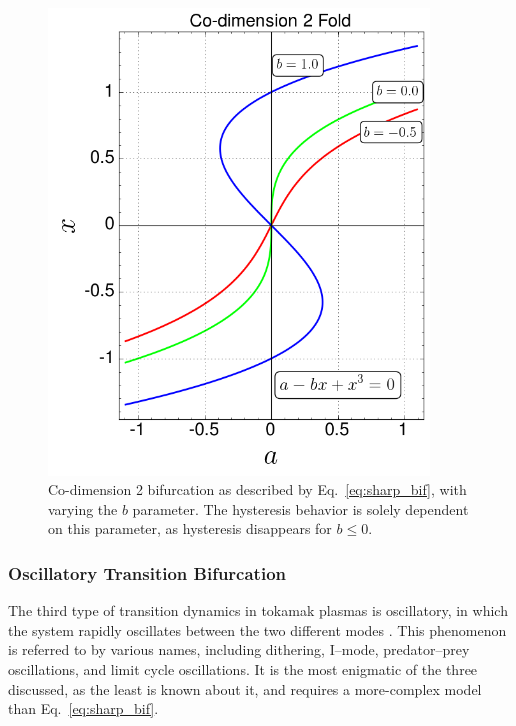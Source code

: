 \begin{figure}[tb] %
\begin{minipage}{0.49\linewidth}
	\centering
	\includegraphics[width=0.9\textwidth]{../Graphics/Bif_Graphs/co-2_fold_b_var.png}
\end{minipage}
\hfill
\begin{minipage}{0.49\linewidth}
	\caption{Co-dimension 2 bifurcation as described by Eq.~\ref{eq:sharp_bif}, with varying the $b$ parameter. The hysteresis behavior is solely dependent on this parameter, as hysteresis disappears for $b \leq 0$.}
	\label{fig:hysteresis_b_var}
\end{minipage}
\end{figure}

\subsubsection{Oscillatory Transition Bifurcation}
The third type of transition dynamics in tokamak plasmas is oscillatory, in which the system rapidly oscillates between the two different modes \cite{ryter_survey_2013} \cite{zohm_mhd_1995}.
This phenomenon is referred to by various names, including dithering, I--mode, predator--prey oscillations, and limit cycle oscillations.
It is the most enigmatic of the three discussed, as the least is known about it, and requires a more-complex model than Eq.~\ref{eq:sharp_bif}.

